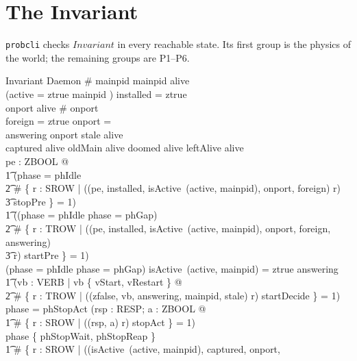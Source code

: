\documentclass[a4paper,10pt,fleqn]{article}
\begin{document}
\section{The Invariant}
\label{sec:invariant}

\texttt{probcli} checks $Invariant$ in every reachable state. Its first group
is the physics of the world; the remaining groups are P1--P6.

\begin{schema}{Invariant}
  Daemon
\where
  \# mainpid  \land mainpid \subseteq alive \\
  (active = ztrue \lor mainpid \neq \emptyset) \implies installed = ztrue \\
  onport \subseteq alive \land \# onport  \\
  foreign = ztrue \implies onport = \emptyset \\
  answering \subseteq onport \land stale \subseteq alive \\
  captured \subseteq alive \land oldMain \subseteq alive \land
    doomed \subseteq alive \land leftAlive \subseteq alive \\
  \forall pe : ZBOOL @ \\
  \t1 (phase = phIdle \implies \\
  \t2 \# \{ r : SROW | ((pe, installed, isActive~(active, mainpid),
    onport, foreign) \mapsto r) \\
  \t3 \in stopPre \} = 1) \land \\
  \t1 ((phase = phIdle \lor phase = phGap) \implies \\
  \t2 \# \{ r : TROW | ((pe, installed, isActive~(active, mainpid),
    onport, foreign, answering) \\
  \t3 \mapsto r) \in startPre \} = 1) \\
  (phase = phIdle \lor phase = phGap) \land
    isActive~(active, mainpid) = ztrue \land
    answering \neq \emptyset \implies \\
  \t1 (\forall vb : VERB | vb \in \{ vStart, vRestart \} @ \\
  \t2 \# \{ r : TROW | ((zfalse, vb, answering, mainpid, stale) \mapsto r)
    \in startDecide \} = 1) \\
  phase = phStopAct \implies (\forall rsp : RESP; a : ZBOOL @ \\
  \t1 \# \{ r : SROW | ((rsp, a) \mapsto r) \in stopAct \} = 1) \\
  phase \in \{ phStopWait, phStopReap \} \implies \\
  \t1 \# \{ r : SROW | ((isActive~(active, mainpid), captured, onport,

\end{schema}
\end{document}
